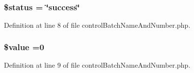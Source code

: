 \hypertarget{control_batch_name_and_number_8php_a58391ea75f2d29d5d708d7050b641c33}{
\subsubsection[{\$status}]{\setlength{\rightskip}{0pt plus 5cm}\$status = \char`\"{}success\char`\"{}}}\label{control_batch_name_and_number_8php_a58391ea75f2d29d5d708d7050b641c33}


Definition at line 8 of file control\-Batch\-Name\-And\-Number.\-php.

\hypertarget{control_batch_name_and_number_8php_a0f298096f322952a72a50f98a74c7b60}{
\subsubsection[{\$value}]{\setlength{\rightskip}{0pt plus 5cm}\$value =0}}\label{control_batch_name_and_number_8php_a0f298096f322952a72a50f98a74c7b60}


Definition at line 9 of file control\-Batch\-Name\-And\-Number.\-php.

